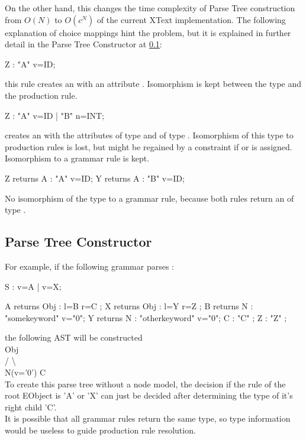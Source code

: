 On the other hand, this changes the time complexity of Parse Tree construction from $O(N)$ to $O(c^N)$ of the current XText implementation. The following explanation of choice mappings hint the problem, but it is explained in further detail in the Parse Tree Constructor at \ref{sub:Xtxt:PTC}: 
\begin{xtxt}
Z 	:  "A" v=ID;
\end{xtxt}
this rule creates an   with an  attribute . Isomorphism is kept between the type  and the production rule.
\begin{xtxt}
Z 	:  "A" v=ID  
	|  "B" n=INT;
	\end{xtxt}
creates an   with the attributes  of type  and  of type .  Isomorphism of this type to production rules is lost, but might be regained by a constraint if  or  is assigned. Isomorphism to a grammar rule is kept.
\begin{xtxt}
Z returns A : "A" v=ID;
Y returns A : "B" v=ID;
\end{xtxt}
No isomorphism of the type  to a grammar rule, because both rules return an  of type .

\subsection{Parse Tree Constructor} \label{sub:Xtxt:PTC}

For example, if the following grammar parses :
\begin{xtxt}
S  	:  	v=A 
	| 	v=X;

A returns Obj	: 	l=B r=C   ;
X returns Obj	: 	l=Y r=Z   ;
B returns N  	:  	"somekeyword" 	v="0";
Y returns N  	: 	"otherkeyword" 	v="0";
C 		:  	 "C" ;
Z 		: 	 "Z" ;
\end{xtxt}
the following AST will be constructed  \\ 
      Obj			\\
     /   \textbackslash		\\
N(v='0')   C	\\
To create this parse tree without a node model, the decision if the rule of the root EObject is 'A' or 'X' can just be decided after determining the type of it's right child 'C'.  \\

It is possible that all grammar rules return the same type, so type information would be useless to guide production rule resolution.\\


